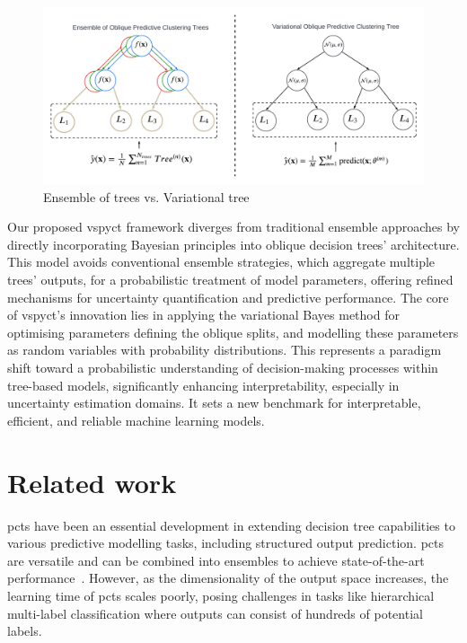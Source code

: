 \documentclass[3p,review,authoryear]{elsarticle}
\begin{document}
\begin{figure}[h!]
    \centering
    \includegraphics[width=1.0\textwidth]{main_flowchart.pdf}
    \caption{Ensemble of trees vs. Variational tree}
    \label{fig:main_flowchart}
\end{figure}

Our proposed \gls{vspyct} framework diverges from traditional ensemble approaches by directly incorporating Bayesian principles into oblique decision trees' architecture.
This model avoids conventional ensemble strategies, which aggregate multiple trees' outputs, for a probabilistic treatment of model parameters, offering refined mechanisms for uncertainty quantification and predictive performance.
The core of \gls{vspyct}'s innovation lies in applying the variational Bayes method for optimising parameters defining the oblique splits, and modelling these parameters as random variables with probability distributions.
This represents a paradigm shift toward a probabilistic understanding of decision-making processes within tree-based models, significantly enhancing interpretability, especially in uncertainty estimation domains.
It sets a new benchmark for interpretable, efficient, and reliable machine learning models.



\section{Related work}


\Glspl{pct} have been an essential development in extending decision tree capabilities to various predictive modelling tasks, including structured output prediction.
\Glspl{pct} are versatile and can be combined into ensembles to achieve state-of-the-art performance~\citep{Kocev_2013}.
However, as the dimensionality of the output space increases, the learning time of \glspl{pct} scales poorly, posing challenges in tasks like hierarchical multi-label classification where outputs can consist of hundreds of potential labels.
\end{document}
